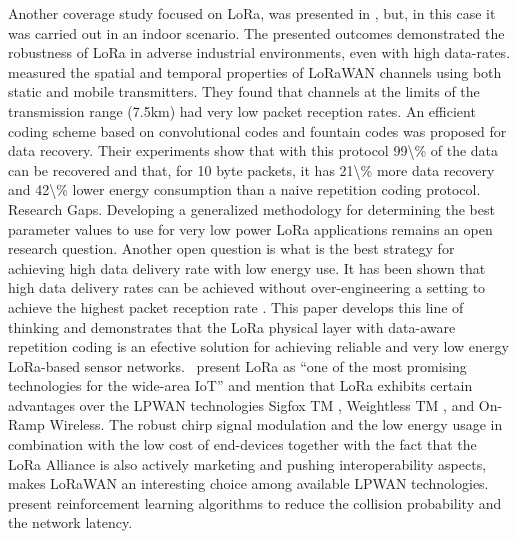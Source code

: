  \cite{haxhibeqiri_lora_2017}   Another coverage study focused on LoRa, was presented in \cite{haxhibeqiri_lora_2017}, but, in this case it was carried out in an indoor scenario. The presented outcomes demonstrated the robustness of LoRa in adverse industrial environments, even with high data-rates.   \newline 
 \cite{marcelis_dare_2017}   \cite{marcelis_dare_2017} measured the spatial and temporal properties of LoRaWAN channels using both static and mobile transmitters. They found that channels at the limits of the transmission range (7.5km) had very low packet reception rates. An efficient coding scheme based on convolutional codes and fountain codes was proposed for data recovery. Their experiments show that with this protocol 99\textbackslash\% of the data can be recovered and that, for 10 byte packets, it has 21\textbackslash\% more data recovery and 42\textbackslash\% lower energy consumption than a naive repetition coding protocol. Research Gaps. Developing a generalized methodology for determining the best parameter values to use for very low power LoRa applications remains an open research question. Another open question is what is the best strategy for achieving high data delivery rate with low energy use. It has been shown that high data delivery rates can be achieved without over-engineering a setting to achieve the highest packet reception rate \cite{marco_cattani_experimental_2017}\cite{marcelis_dare_2017}. This paper develops this line of thinking and demonstrates that the LoRa physical layer with data-aware repetition coding is an efective solution for achieving reliable and very low energy LoRa-based sensor networks.~   \newline 
 \cite{atanasovski_long-range_2015}   \citet{atanasovski_long-range_2015} present LoRa as ``one of the most promising technologies for the wide-area IoT'' and mention that LoRa exhibits certain advantages over the LPWAN technologies Sigfox TM , Weightless TM , and On-Ramp Wireless. The robust chirp signal modulation and the low energy usage in combination with the low cost of end-devices together with the fact that the LoRa Alliance is also actively marketing and pushing interoperability aspects, makes LoRaWAN an interesting choice among available LPWAN technologies.~   \newline 
 \cite{bonnefoi_improvement_2018}   \citet{bonnefoi_improvement_2018} present reinforcement learning algorithms to reduce the collision probability and the network latency.~   \newline 
